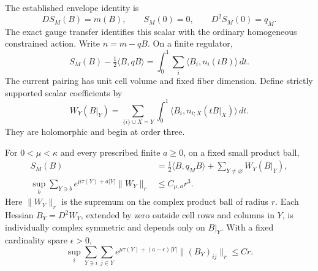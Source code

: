 The established envelope identity is
\begin{equation}
 DS_M(B)=m(B),\qquad S_M(0)=0,\qquad D^2S_M(0)=q_M.          \label{cl-envelope-input}
\end{equation}
The exact gauge transfer identifies this scalar with the ordinary
homogeneous constrained action. Write $n=m-qB$. On a finite regulator,
\begin{equation}
 S_M(B)-\tfrac12\langle B,qB\rangle
    =\int_0^1\sum_i\langle B_i,n_i(tB)\rangle\,dt.           \label{cl-envelope}
\end{equation}
The current pairing has unit cell volume and fixed fiber dimension.
Define strictly supported scalar coefficients by
\begin{equation}
 W_Y(B|_Y)=
 \sum_{\{i\}\cup X=Y}\int_0^1
       \langle B_i,n_{i;X}(tB|_X)\rangle\,dt.                \label{cl-action-coefficients}
\end{equation}
They are holomorphic and begin at order three.

\begin{proposition}
\label{cl-action-theorem}
For $0<\mu<\kappa$ and every prescribed finite $a\ge0$, on a fixed
small product ball,
\begin{align}
 S_M(B)&=\tfrac12\langle B,q_MB\rangle+\sum_{Y\ne\varnothing}W_Y(B|_Y),
                                                               \label{cl-action-expansion}\\
 \sup_b\sum_{Y\ni b}e^{\mu\tau(Y)+a|Y|}\|W_Y\|_r
       &\le C_{\mu,a}r^3.                                    \label{cl-action-norm}
\end{align}
Here $\|W_Y\|_r$ is the supremum on the complex product ball of radius
$r$. Each Hessian $B_Y=D^2W_Y$, extended by zero outside cell rows and
columns in $Y$, is individually complex symmetric and depends only on
$B|_Y$. With a fixed cardinality spare $\epsilon>0$,
\begin{equation}
 \sup_i\sum_{Y\ni i}\sum_{j\in Y}
 e^{\mu\tau(Y)+(a-\epsilon)|Y|}
            \|(B_Y)_{ij}\|_r\le C r.                       \label{cl-hessian-support}
\end{equation}
\end{proposition}

